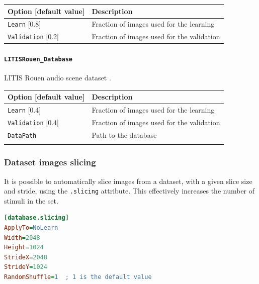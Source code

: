 \documentclass[a4paper,11pt,oneside]{article}
\begin{document}
\begin{center}
 \begin{tabular}{| p{5cm} | p{10cm} | }
 \hline
 Option [default value] & Description\\
 \hline\hline
  \cellcolor{requiredcolor}
  \lstinline!Learn! [0.8] & Fraction of images used for the learning \\
  \lstinline!Validation! [0.2] & Fraction of images used for the validation \\
 \hline
\end{tabular}
\end{center}

\paragraph{\texorpdfstring{%
\lstinline[basicstyle=\ttfamily\bfseries]!LITISRouen_Database!}
{LITISRouen\_Database}}
LITIS Rouen audio scene dataset \citep{Rakotomamonjy2014}.

\begin{center}
 \begin{tabular}{| p{5cm} | p{10cm} | }
 \hline
 Option [default value] & Description\\
 \hline\hline
  \lstinline!Learn! [0.4] & Fraction of images used for the learning \\
  \lstinline!Validation! [0.4] & Fraction of images used for the validation \\
  \lstinline!DataPath! & Path to the database \\
   & \\
 \hline
\end{tabular}
\end{center}

\subsubsection{Dataset images slicing}

It is possible to automatically slice images from a dataset, with a given slice
 size and stride, using the \lstinline!.slicing! attribute. This effectively
 increases the number of stimuli in the set.

\begin{lstlisting}[language=ini]
[database.slicing]
ApplyTo=NoLearn
Width=2048
Height=1024
StrideX=2048
StrideY=1024
RandomShuffle=1  ; 1 is the default value
\end{lstlisting}
\end{document}
